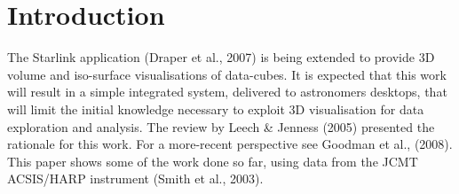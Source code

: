 \documentclass[11pt,twoside]{article}  %
\begin{document}
%
%

\section{Introduction}
The Starlink 
application (Draper et al., 2007) is being extended to provide 3D volume and
iso-surface visualisations of data-cubes. It is expected that this work will
result in a simple integrated system, delivered to astronomers desktops, that
will limit the initial knowledge necessary to exploit 3D visualisation for
data exploration and analysis.
The review by Leech \& Jenness (2005) presented the rationale for this work.
For a more-recent perspective see Goodman et al., (2008).
This paper shows some of the work done so far, using data from the JCMT
ACSIS/HARP instrument (Smith et al., 2003).
\end{document}
